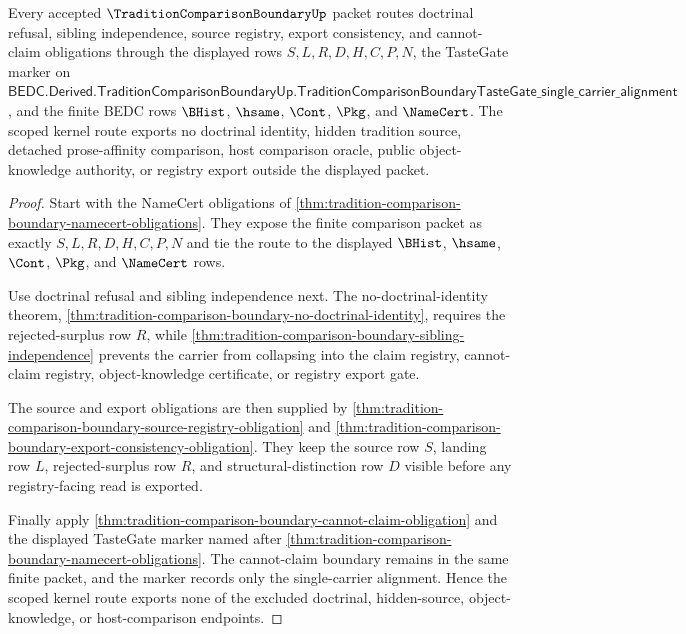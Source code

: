 \begin{theorem}
\label{thm:tradition-comparison-boundary-scoped-kernel-route}
Every accepted $\TraditionComparisonBoundaryUp$ packet routes doctrinal refusal, sibling independence, source registry, export consistency, and cannot-claim obligations through the displayed rows $S,L,R,D,H,C,P,N$, the TasteGate marker on $\mathsf{BEDC.Derived.TraditionComparisonBoundaryUp.TraditionComparisonBoundaryTasteGate\_single\_carrier\_alignment}$, and the finite BEDC rows $\BHist$, $\hsame$, $\Cont$, $\Pkg$, and $\NameCert$. The scoped kernel route exports no doctrinal identity, hidden tradition source, detached prose-affinity comparison, host comparison oracle, public object-knowledge authority, or registry export outside the displayed packet.
\end{theorem}
\begin{proof}
Start with the NameCert obligations of \autoref{thm:tradition-comparison-boundary-namecert-obligations}. They expose the finite comparison packet as exactly $S,L,R,D,H,C,P,N$ and tie the route to the displayed $\BHist$, $\hsame$, $\Cont$, $\Pkg$, and $\NameCert$ rows.

Use doctrinal refusal and sibling independence next. The no-doctrinal-identity theorem, \autoref{thm:tradition-comparison-boundary-no-doctrinal-identity}, requires the rejected-surplus row $R$, while \autoref{thm:tradition-comparison-boundary-sibling-independence} prevents the carrier from collapsing into the claim registry, cannot-claim registry, object-knowledge certificate, or registry export gate.

The source and export obligations are then supplied by \autoref{thm:tradition-comparison-boundary-source-registry-obligation} and \autoref{thm:tradition-comparison-boundary-export-consistency-obligation}. They keep the source row $S$, landing row $L$, rejected-surplus row $R$, and structural-distinction row $D$ visible before any registry-facing read is exported.

Finally apply \autoref{thm:tradition-comparison-boundary-cannot-claim-obligation} and the displayed TasteGate marker named after \autoref{thm:tradition-comparison-boundary-namecert-obligations}. The cannot-claim boundary remains in the same finite packet, and the marker records only the single-carrier alignment. Hence the scoped kernel route exports none of the excluded doctrinal, hidden-source, object-knowledge, or host-comparison endpoints.
\end{proof}

